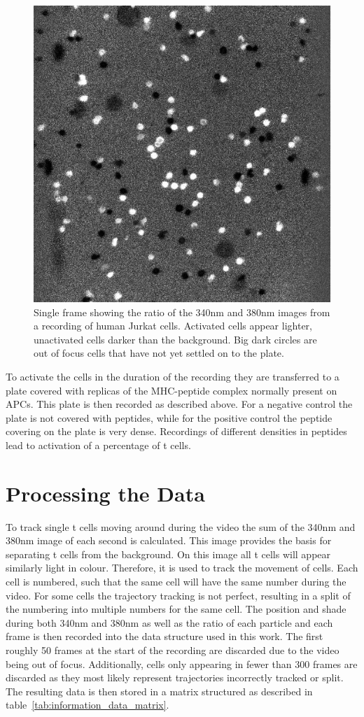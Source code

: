 \begin{figure}
	\centering
	\includegraphics[width=0.6\linewidth]{fig/frame_ratio.jpg}
	\caption{Single frame showing the ratio of the 340nm and 380nm images from a recording of human Jurkat cells. Activated cells appear lighter, unactivated cells darker than the background. Big dark circles are out of focus cells that have not yet settled on to the plate.}
	\label{fig:example_ratio_img}
\end{figure}

To activate the cells in the duration of the recording they are transferred to a plate covered with replicas of the MHC-peptide complex normally present on APCs. This plate is then recorded as described above. For a negative control the plate is not covered with peptides, while for the positive control the peptide covering on the plate is very dense. Recordings of different densities in peptides lead to activation of a percentage of t cells.

\section{Processing the Data}

To track single t cells moving around during the video the sum of the 340nm and 380nm image of each second is calculated. This image provides the basis for separating t cells from the background. On this image all t cells will appear similarly light in colour. Therefore, it is used to track the movement of cells. Each cell is numbered, such that the same cell will have the same number during the video. For some cells the trajectory tracking is not perfect, resulting in a split of the numbering into multiple numbers for the same cell. The position and shade during both 340nm and 380nm as well as the ratio of each particle and each frame is then recorded into the data structure used in this work. The first roughly 50 frames at the start of the recording are discarded due to the video being out of focus. Additionally, cells only appearing in fewer than 300 frames are discarded as they most likely represent trajectories incorrectly tracked or split. The resulting data is then stored in a matrix structured as described in table~\ref{tab:information_data_matrix}.
